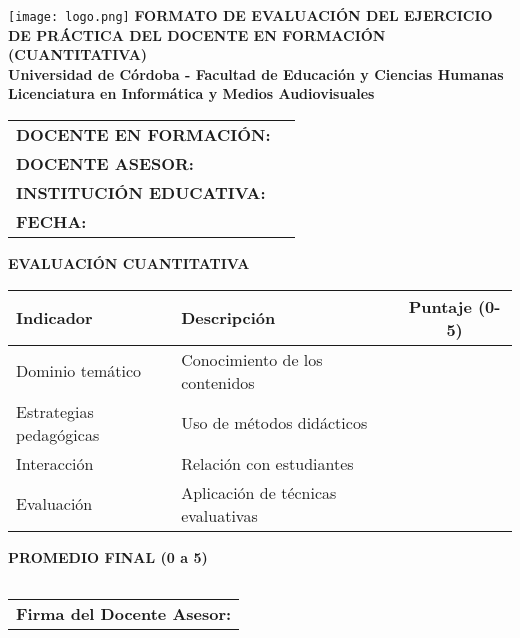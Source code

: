 \documentclass[a4paper,12pt]{article}
\begin{document}
\begin{center}
    \vspace*{1cm}
    \texttt{[image: logo.png]} %
    \vspace{0.5cm}
    \textbf{\Large FORMATO DE EVALUACIÓN DEL EJERCICIO DE PRÁCTICA DEL DOCENTE EN FORMACIÓN (CUANTITATIVA)} \\
    \vspace{0.5cm}
    \textbf{Universidad de Córdoba - Facultad de Educación y Ciencias Humanas} \\
    \textbf{Licenciatura en Informática y Medios Audiovisuales}
\end{center}

\vspace{0.5cm}
\begin{tabularx}{\textwidth}{@{}p{5cm}X@{}}
    \toprule
    \textbf{DOCENTE EN FORMACIÓN:} & \hrulefill \\
    \textbf{DOCENTE ASESOR:} & \hrulefill \\
    \textbf{INSTITUCIÓN EDUCATIVA:} & \hrulefill \\
    \textbf{FECHA:} & \hrulefill \\
    \bottomrule
\end{tabularx}

\vspace{0.5cm}
\noindent
\textbf{EVALUACIÓN CUANTITATIVA}
\begin{table}[h]
    \centering
    \scriptsize
    \begin{tabularx}{\textwidth}{|p{5cm}|X|c|}
        \hline
        \textbf{Indicador} & \textbf{Descripción} & \textbf{Puntaje (0-5)} \\
        \hline
        Dominio temático & Conocimiento de los contenidos & \\ \hline
        Estrategias pedagógicas & Uso de métodos didácticos & \\ \hline
        Interacción & Relación con estudiantes & \\ \hline
        Evaluación & Aplicación de técnicas evaluativas & \\ \hline
    \end{tabularx}
\end{table}

\vspace{0.5cm}
\noindent
\textbf{PROMEDIO FINAL (0 a 5)}
\begin{tabularx}{\textwidth}{|X|}
    \hline
    \vspace{1cm} \\ \hline
\end{tabularx}

\vspace{0.5cm}
\begin{center}
    \begin{tabular}{p{7cm}}
        \hline
        \textbf{Firma del Docente Asesor:} \hrulefill \\
    \end{tabular}
\end{center}
\end{document}
